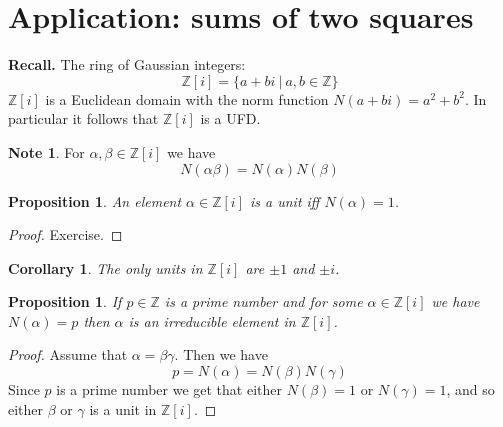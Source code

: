 \documentclass[12pt, letterpaper, oneside]{article}
\theoremstyle{plain}
\newtheorem{proposition}[theorem]{Proposition}
\newtheorem{corollary}[theorem]{Corollary}
\theoremstyle{definition}
\newtheorem{note}[theorem]{Note}
\newcommand{\Z}{{\mathbb Z}}
\newcommand{\vs}{\vskip 5mm}
\begin{document}


\newpage
\section{Application: sums of two squares}
\label{SEC_SUMS2SQRS}


\textbf{Recall.} The ring of Gaussian integers:
$$\Z[i] = \{a +bi \ | \ a, b\in \Z\}$$
$\Z[i]$ is a Euclidean domain with the norm function $N(a+bi) = a^{2}+b^{2}$. 
In particular it follows that $\Z[i]$ is a UFD.

\vs\vs

\begin{note}
For $\alpha, \beta\in \Z[i]$ we have 
$$N(\alpha\beta) = N(\alpha)N(\beta)$$
\end{note}

\vs\vs


\begin{proposition}
\label{PROP_ZIUNITS}
An element $\alpha\in \Z[i]$ is a unit iff $N(\alpha) = 1$.
\end{proposition} 


\begin{proof}
Exercise.
\end{proof}

\vs\vs

\begin{corollary}
The only units in $\Z[i]$ are $\pm 1$ and $\pm i$. 
\end{corollary}




\vs\vs

\begin{proposition}
If $p\in \Z$ is a prime number and for some $\alpha\in \Z[i]$ we have $N(\alpha) = p$ then 
$\alpha$ is an irreducible element in $\Z[i]$.
\end{proposition}


\vs

\begin{proof}
Assume that $\alpha = \beta\gamma$. Then we have 
$$p = N(\alpha) = N(\beta)N(\gamma)$$
Since $p$ is a prime number we get that either $N(\beta)=1$ or $N(\gamma)=1$, and so 
either $\beta$ or $\gamma$ is a unit in $\Z[i]$.
\end{proof}


\vs\vs\vs
\end{document}

